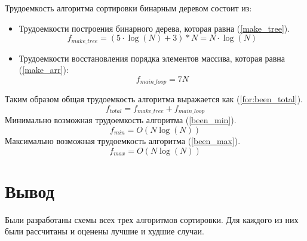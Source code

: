 Трудоемкость алгоритма сортировки бинарным деревом состоит из:
\begin{itemize}
	\item Трудоемкости построения бинарного дерева, которая равна (\ref{make_tree}).
	\begin{equation}
		\label{make_tree}
		f_{make\_tree} = (5 \cdot \log(N) + 3) * N = N \cdot \log(N)
	\end{equation}
	\item Трудоемкости восстановления порядка элементов массива, которая равна (\ref{make_arr}):
	\begin{equation}
		\label{make_arr}
		f_{main\_loop} = 7 N
	\end{equation}
\end{itemize}
Таким образом общая трудоемкость алгоритма выражается как (\ref{for:been_total}).
\begin{equation}
	\label{for:been_total}
	f_{total} = f_{make\_tree} + f_{main\_loop}
\end{equation}
Минимально возможная трудоемкость алгоритма (\ref{been_min}).
\begin{equation}
	\label{been_min}
	f_{min} = O(N\log(N))
\end{equation}
Максимально возможная трудоемкость алгоритма (\ref{been_max}).
\begin{equation}
	\label{been_max}
	f_{max} = O(N\log(N))
\end{equation}

\newpage
{}

\newpage
{}

\newpage
{}

\newpage
{}

\newpage
\section*{Вывод}
Были разработаны схемы всех трех алгоритмов сортировки. Для каждого из них были рассчитаны и оценены лучшие и худшие случаи.



